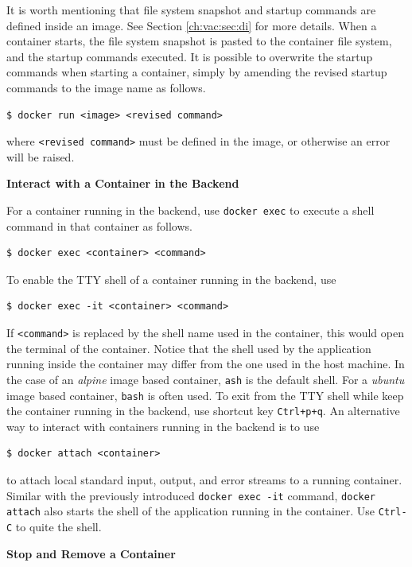 It is worth mentioning that file system snapshot and startup commands are defined inside an image. See Section \ref{ch:vac:sec:di} for more details. When a container starts, the file system snapshot is pasted to the container file system, and the startup commands executed. It is possible to overwrite the startup commands when starting a container, simply by amending the revised startup commands to the image name as follows.
\begin{lstlisting}
$ docker run <image> <revised command>
\end{lstlisting}
where \verb|<revised command>| must be defined in the image, or otherwise an error will be raised.

\vspace{0.1in}
\noindent \textbf{Interact with a Container in the Backend}
\vspace{0.1in}

For a container running in the backend, use \verb|docker exec| to execute a shell command in that container as follows.
\begin{lstlisting}
$ docker exec <container> <command>
\end{lstlisting}
To enable the TTY shell of a container running in the backend, use
\begin{lstlisting}
$ docker exec -it <container> <command>
\end{lstlisting}
If \verb|<command>| is replaced by the shell name used in the container, this would open the terminal of the container. Notice that the shell used by the application running inside the container may differ from the one used in the host machine. In the case of an \textit{alpine} image based container, \verb|ash| is the default shell. For a \textit{ubuntu} image based container, \verb|bash| is often used. To exit from the TTY shell while keep the container running in the backend, use shortcut key \verb|Ctrl+p+q|. An alternative way to interact with containers running in the backend is to use
\begin{lstlisting}
$ docker attach <container>
\end{lstlisting}
to attach local standard input, output, and error streams to a running container. Similar with the previously introduced \texttt{docker exec -it} command, \texttt{docker attach} also starts the shell of the application running in the container. Use \verb|Ctrl-C| to quite the shell.

\vspace{0.1in}
\noindent \textbf{Stop and Remove a Container}
\vspace{0.1in}

